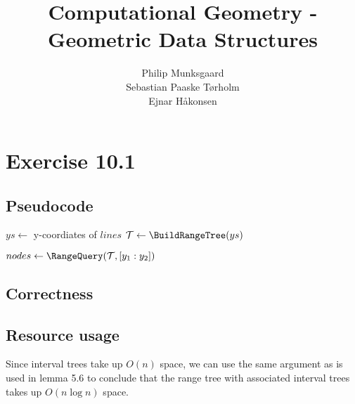 \documentclass[11pt,a4paper]{article}
\title{Computational Geometry - Geometric Data Structures}
\author{Philip Munksgaard \\ Sebastian Paaske Tørholm \\ Ejnar Håkonsen}
\begin{document}
\maketitle

\section{Exercise 10.1}
\subsection{Pseudocode}
\begin{algorithm}[H]
	\caption{$lines$\FuncSty{)}}

	\SetArgSty{}

    $ys \leftarrow $ y-coordiates of $lines$\;
    $\mathcal{T} \leftarrow \BuildRangeTree(ys)$\; 

    \;
\end{algorithm}

\begin{algorithm}[H]

    \caption{$\mathcal{T},x,[y_1 : y_2]$\FuncSty{)}}
	
	\SetArgSty{}

    $nodes \leftarrow \RangeQuery(\mathcal{T}, [y_1 : y_2])$\; 

\end{algorithm}

\subsection{Correctness}

\subsection{Resource usage}
Since interval trees take up $O(n)$ space, we can use the same argument as is used
in lemma 5.6 to conclude that the range tree with associated interval trees takes up
$O(n \log n)$ space.
\end{document}
